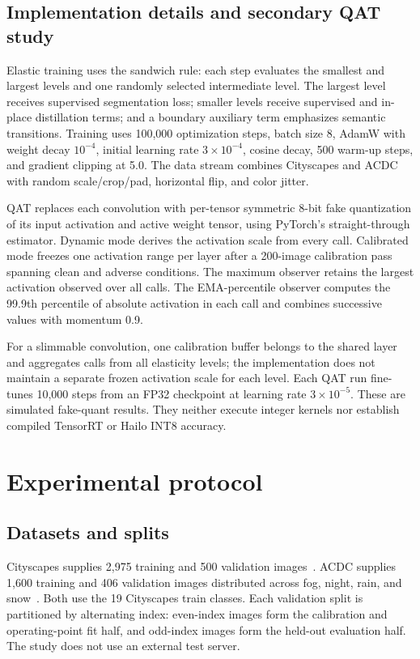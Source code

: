 \documentclass[a4paper,review,12pt]{elsarticle}
\begin{document}
\subsection{Implementation details and secondary QAT study}
\label{sec:qatmethod}

Elastic training uses the sandwich rule: each step evaluates the smallest and largest levels and one randomly selected intermediate level. The largest level receives supervised segmentation loss; smaller levels receive supervised and in-place distillation terms; and a boundary auxiliary term emphasizes semantic transitions. Training uses 100,000 optimization steps, batch size 8, AdamW with weight decay $10^{-4}$, initial learning rate $3\times10^{-4}$, cosine decay, 500 warm-up steps, and gradient clipping at 5.0. The data stream combines Cityscapes and ACDC with random scale/crop/pad, horizontal flip, and color jitter.

QAT replaces each convolution with per-tensor symmetric 8-bit fake quantization of its input activation and active weight tensor, using PyTorch's straight-through estimator. Dynamic mode derives the activation scale from every call. Calibrated mode freezes one activation range per layer after a 200-image calibration pass spanning clean and adverse conditions. The maximum observer retains the largest activation observed over all calls. The EMA-percentile observer computes the 99.9th percentile of absolute activation in each call and combines successive values with momentum 0.9.

For a slimmable convolution, one calibration buffer belongs to the shared layer and aggregates calls from all elasticity levels; the implementation does not maintain a separate frozen activation scale for each level. Each QAT run fine-tunes 10,000 steps from an FP32 checkpoint at learning rate $3\times10^{-5}$. These are simulated fake-quant results. They neither execute integer kernels nor establish compiled TensorRT or Hailo INT8 accuracy.

\section{Experimental protocol}
\label{sec:protocol}

\subsection{Datasets and splits}

Cityscapes supplies 2,975 training and 500 validation images~\cite{cordts2016cityscapes}. ACDC supplies 1,600 training and 406 validation images distributed across fog, night, rain, and snow~\cite{sakaridis2021acdc}. Both use the 19 Cityscapes train classes. Each validation split is partitioned by alternating index: even-index images form the calibration and operating-point fit half, and odd-index images form the held-out evaluation half. The study does not use an external test server.
\end{document}

